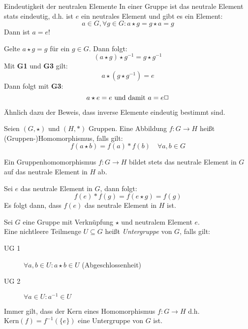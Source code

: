 \begin{satz}{Eindeutigkeit der neutralen Elemente}
  In einer Gruppe ist das neutrale Element stats eindeutig, d.h. ist $e$ ein neutrales Element und gibt es ein Element:
  \begin{equation*}
    a\in G, \forall g\in G : a\star g = g\star a = g
  \end{equation*}
  Dann ist $a = e$!
\end{satz}


\beweis
Gelte $a\star g = g$ für ein $g\in G$. Dann folgt:
\begin{equation*}
  (a\star g)\star g^{-1}=g\star g^{-1}
\end{equation*}
Mit \textbf{G1} und \textbf{G3} gilt:
\begin{equation*}
  a\star (g\star g^{-1})=e
\end{equation*}
Dann folgt mit \textbf{G3}:
\begin{equation*}
  a\star e=e \text{ und damit } a=e \hfill\Box
\end{equation*}

\bemerkung
Ähnlich dazu der Beweis, dass inverse Elemente eindeutig bestimmt sind.


Seien $(G,\star)$ und $(H,\ast)$ Gruppen. Eine Abbildung $f:G\rightarrow H$ heißt (Gruppen-)Homomorphismus, falls gilt:
\begin{equation*}
  f(a\star b)=f(a)\ast f(b)\quad\forall a,b\in G
\end{equation*}

\begin{lemma}{}
  Ein Gruppenhomomorphismus $f:G\rightarrow H$ bildet stets das neutrale Element in $G$ auf das neutrale Element in $H$ ab.
\end{lemma}
\beweis
Sei $e$ das neutrale Element in $G$, dann folgt:
\begin{equation*}
  f(e)\ast f(g)=f(e\star g)=f(g)
\end{equation*}
Es folgt dann, dass $f(e)$ das neutrale Element in $H$ ist.


Sei $G$ eine Gruppe mit Verknüpfung $\star$ und neutralem Element $e$.\\
Eine nichtleere Teilmenge $U\subseteq G$ heißt \emph{Untergruppe} von $G$, falls gilt:
\begin{description}
  \item[UG 1] $\forall a,b\in U : a\star b\in U$ (Abgeschlossenheit)
  \item[UG 2] $\forall a\in U : a^{-1}\in U$
\end{description}

Immer gilt, dass der Kern eines Homomorphismus $f:G \rightarrow H$ d.h. $\mathrm{Kern}(f)=f^{-1}(\{e\})$  eine Untergruppe von $G$ ist.
